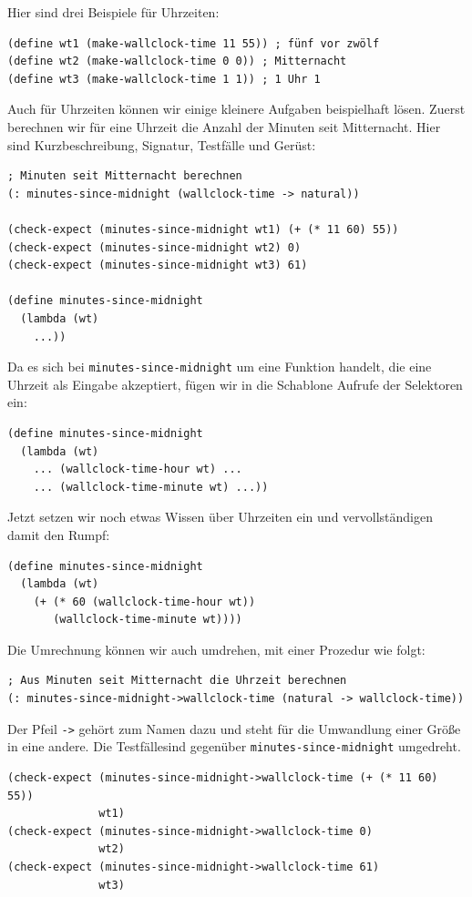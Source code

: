 Hier sind drei Beispiele für Uhrzeiten:
%
\begin{verbatim}
(define wt1 (make-wallclock-time 11 55)) ; fünf vor zwölf
(define wt2 (make-wallclock-time 0 0)) ; Mitternacht
(define wt3 (make-wallclock-time 1 1)) ; 1 Uhr 1
\end{verbatim}
%
Auch für Uhrzeiten können wir einige kleinere Aufgaben beispielhaft
lösen.  Zuerst berechnen wir für eine Uhrzeit die Anzahl der Minuten
seit Mitternacht.  Hier sind Kurzbeschreibung, Signatur, Testfälle und Gerüst:
%
\begin{verbatim}
; Minuten seit Mitternacht berechnen
(: minutes-since-midnight (wallclock-time -> natural))

(check-expect (minutes-since-midnight wt1) (+ (* 11 60) 55))
(check-expect (minutes-since-midnight wt2) 0)
(check-expect (minutes-since-midnight wt3) 61)

(define minutes-since-midnight
  (lambda (wt)
    ...))
\end{verbatim}
%
Da es sich bei \texttt{minutes-since-midnight} um eine Funktion
handelt, die eine Uhrzeit als Eingabe akzeptiert, fügen wir in die
Schablone Aufrufe der Selektoren ein:
%
\begin{verbatim}
(define minutes-since-midnight
  (lambda (wt)
    ... (wallclock-time-hour wt) ...
    ... (wallclock-time-minute wt) ...))
\end{verbatim}
%
Jetzt setzen wir noch etwas Wissen über Uhrzeiten ein und
vervollständigen damit den Rumpf:
%
\begin{verbatim}
(define minutes-since-midnight
  (lambda (wt)
    (+ (* 60 (wallclock-time-hour wt))
       (wallclock-time-minute wt))))
\end{verbatim}
%
Die Umrechnung können wir auch umdrehen, mit einer Prozedur wie folgt:
%
\begin{verbatim}
; Aus Minuten seit Mitternacht die Uhrzeit berechnen
(: minutes-since-midnight->wallclock-time (natural -> wallclock-time))
\end{verbatim}
%
Der Pfeil \verb|->| gehört zum Namen dazu und steht für die Umwandlung
einer Größe in eine andere.  Die Testfällesind gegenüber
\texttt{minutes-since-midnight} umgedreht.
%
\begin{verbatim}
(check-expect (minutes-since-midnight->wallclock-time (+ (* 11 60) 55))
              wt1)
(check-expect (minutes-since-midnight->wallclock-time 0)
              wt2)
(check-expect (minutes-since-midnight->wallclock-time 61)
              wt3)
\end{verbatim}
